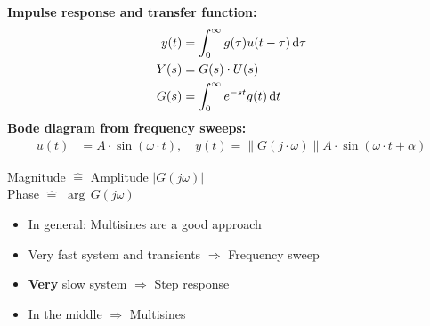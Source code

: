\begin{tcolorbox}[colback=brown!5!white,colframe=brown!75!black,title=\textbf{Nonparametric and Frequency Domain Identification Models}]
\textbf{Impulse response and transfer function:}
\begin{align*}
	y(t) &= \int_{0}^{\infty} g(\tau) u(t-\tau) \, \mathrm{d} \tau \\
	Y(s) &= G(s)\cdot U(s) \\
	G(s) &= \int_{0}^{\infty} e^{-st} g(t) \, \mathrm{d} t 
\end{align*}
\textbf{Bode diagram from frequency sweeps:}
\begin{align*}
	u(t) &= A \cdot \sin(\omega \cdot t),\quad y(t) = \lVert G (j\cdot \omega )\rVert A \cdot \sin(\omega \cdot t + \alpha)
\end{align*}
\end{tcolorbox}

\begin{tcolorbox}[colback=brown!5!white,colframe=brown!75!black,title=\textbf{Bode Diagramm}]
	Magnitude $\widehat{=}$ Amplitude $|G(j\omega)|$\\
	Phase $\widehat{=}$ $\arg \, G(j\omega)$
  \end{tcolorbox}

  \begin{tcolorbox}[colback=brown!5!white,colframe=brown!75!black,title=\textbf{When to use what in frequency response}]
	\begin{itemize}
	\item In general: Multisines are a good approach
	\item Very fast system and transients $\Rightarrow$ Frequency sweep
	\item \textbf{Very} slow system $\Rightarrow$ Step response
	\item In the middle $\Rightarrow$ Multisines
	\end{itemize}
  \end{tcolorbox}




